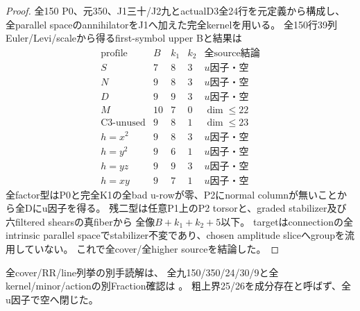 \documentclass[a4paper,11pt]{ltjsarticle}
\theoremstyle{definition}
\begin{document}
\begin{proof}
全150 P0、元350、J1三十/J2九とactualD3全24行を元定義から構成し、
全parallel spaceのannihilatorをJ1へ加えた完全kernelを用いる。
全150行39列Euler/Levi/scaleから得るfirst-symbol upper Bと結果は
\[
\begin{array}{c|c|c|c|c}
 \text{profile}&B&k_1&k_2&\text{全source結論}\\\hline
 S&7&8&3&u\text{因子・空}\\
 N&9&8&3&u\text{因子・空}\\
 D&9&9&3&u\text{因子・空}\\
 M&10&7&0&\dim\le22\\
 \text{C3-unused}&9&8&1&\dim\le23\\
 h=x^2&9&8&3&u\text{因子・空}\\
 h=y^2&9&6&1&u\text{因子・空}\\
 h=yz&9&9&3&u\text{因子・空}\\
 h=xy&9&7&1&u\text{因子・空}
\end{array}
\]
全factor型はP0と完全K1の全bad u-rowが零、P2にnormal columnが無いことから全Dにu因子を得る。
残二型は任意P1上のP2 torsorと、graded stabilizer及び六filtered shearsの真fiberから
全像$B+k_1+k_2+5$以下。
targetはconnectionの全intrinsic parallel spaceでstabilizer不変であり、chosen amplitude sliceへgroupを流用していない。
これで全cover/全higher sourceを結論した。
\end{proof}
全cover/RR/line列挙の別手読解は、
全九150/350/24/30/9と全kernel/minor/actionの別Fraction確認は
。
粗上界25/26を成分存在と呼ばず、全u因子で空へ閉じた。
\end{document}
